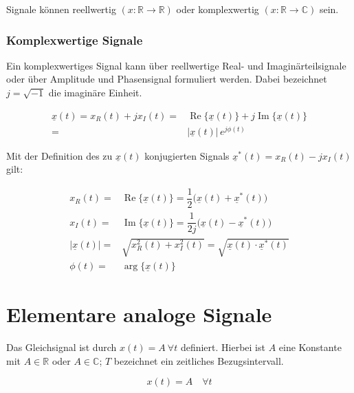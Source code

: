 Signale können reellwertig $(x: \mathbb{R} \rightarrow \mathbb{R})$ oder komplexwertig 
$(x: \mathbb{R} \rightarrow \mathbb{C})$ sein.

\subsubsection{Komplexwertige Signale}

Ein komplexwertiges Signal kann über reellwertige Real- und Imaginärteilsignale oder über Amplitude
und Phasensignal formuliert werden. Dabei bezeichnet $j = \sqrt{-1}$ die imaginäre Einheit.

$$
\begin{array}{rl}
\underline{x}(t) = x_R(t) + jx_I(t) = & \operatorname{Re}\{\underline{x}(t)\} + j\operatorname{Im}\{\underline{x}(t)\}\\
= & |\underline{x}(t)|\,e^{j \phi(t)}
\end{array}
$$

Mit der Definition des zu $\underline{x}(t)$ konjugierten Signals $\underline{x}^*(t) = x_R(t) - jx_I(t)$ gilt:

$$
\begin{array}{rl}
x_R(t) = & \operatorname{Re}\{\underline{x}(t)\} = \dfrac{1}{2}\bigl(\underline{x}(t) + \underline{x}^*(t)\bigr) \\[8pt]
x_I(t) = & \operatorname{Im}\{\underline{x}(t)\} = \dfrac{1}{2j}\bigl(\underline{x}(t) - \underline{x}^*(t)\bigr) \\[8pt]
|\underline{x}(t)| = & \sqrt{x_R^2(t) + x_I^2(t)} = \sqrt{\underline{x}(t)\cdot \underline{x}^*(t)} \\[8pt]
\phi(t) = & \arg\{\underline{x}(t)\}
\end{array}
$$

\section{Elementare analoge Signale}
\label{sec:elementare-analoge-signale}

\begin{definition}[Gleichsignal]
Das Gleichsignal ist durch $x(t) = A\ \forall t$ definiert. Hierbei ist $A$ eine Konstante mit $A \in \mathbb{R}$ oder $A \in \mathbb{C}$; $T$ bezeichnet ein zeitliches Bezugsintervall.

$$
x(t) = A \quad \forall t
$$


\begin{center}
\end{center}

\end{definition}


